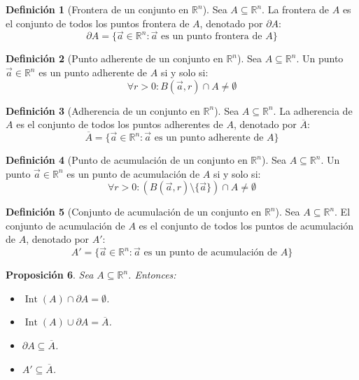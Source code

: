 \documentclass{article}
\newcommand{\R}{\mathbb{R}}
\newcommand{\vect}[1]{\vec{#1}}
\theoremstyle{definition}
\newtheorem{definition}{Definición}[section]
\theoremstyle{plain}
\newtheorem{proposition}[definition]{Proposición}
\theoremstyle{remark}
\theoremstyle{corollary}
\begin{document}
\begin{definition}[Frontera de un conjunto en $\R^n$]

Sea $A \subseteq \R^n$. La frontera de $A$ es el conjunto de todos los puntos frontera de $A$, denotado por $\partial A$:
\[
\partial A = \{ \vect{a} \in \R^n : \vect{a} \text{ es un punto frontera de } A \}
\]
\end{definition}

\begin{definition}[Punto adherente de un conjunto en $\R^n$]

Sea $A \subseteq \R^n$. Un punto $\vect{a} \in \R^n$ es un punto adherente de $A$ si y solo si:
\[
\forall r > 0 : B(\vect{a}, r) \cap A \neq \emptyset
\]
\end{definition}

\begin{definition}[Adherencia de un conjunto en $\R^n$]

Sea $A \subseteq \R^n$. La adherencia de $A$ es el conjunto de todos los puntos adherentes de $A$, denotado por $\overline{A}$:
\[
\overline{A} = \{ \vect{a} \in \R^n : \vect{a} \text{ es un punto adherente de } A \}
\]
\end{definition}

\begin{definition}[Punto de acumulación de un conjunto en $\R^n$]

Sea $A \subseteq \R^n$. Un punto $\vect{a} \in \R^n$ es un punto de acumulación de $A$ si y solo si:
\[
\forall r > 0 : (B(\vect{a}, r) \setminus \{\vect{a}\}) \cap A \neq \emptyset
\]
\end{definition}

\begin{definition}[Conjunto de acumulación de un conjunto en $\R^n$]

Sea $A \subseteq \R^n$. El conjunto de acumulación de $A$ es el conjunto de todos los puntos de acumulación de $A$, denotado por $A'$:
\[
A' = \{ \vect{a} \in \R^n : \vect{a} \text{ es un punto de acumulación de } A \}
\]
\end{definition}

\begin{proposition}
Sea $A \subseteq \R^n$. Entonces:

\begin{itemize}
\item $\operatorname{Int}(A) \cap \partial A = \emptyset$.
\item $\operatorname{Int}(A) \cup \partial A = \overline{A}$.
\item $\partial A \subseteq \overline{A}$.
\item $A' \subseteq \overline{A}$.
\end{itemize}
\end{proposition}
\end{document}
